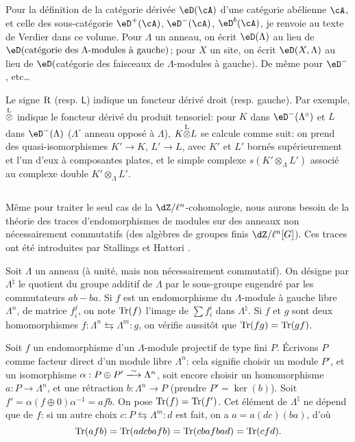 \subsection{}\label{II:4-1}

Pour la définition de la catégorie dérivée $\eD(\cA)$ d'une catégorie 
abélienne $\cA$, et celle des sous-catégorie $\eD^+(\cA)$, $\eD^-(\cA)$, 
$\eD^b(\cA)$, je renvoie au texte de Verdier dans ce volume. Pour $\Lambda$ 
un anneau, on écrit $\eD(\Lambda)$ au lieu de 
$\eD(\text{catégorie des $\Lambda$-modules à gauche})$; pour $X$ un site, on 
écrit $\eD(X,\Lambda)$ au lieu de 
$\eD($catégorie des faisceaux de $\Lambda$-modules à gauche$)$. De 
même pour $\eD^-$, etc\ldots

Le signe $\mathrm{R}$ (resp. $\mathsf{L}$) indique un foncteur dérivé droit (resp. 
gauche). Par exemple, ${\overset{\mathrm{L}}{\otimes}}$ indique le foncteur dérivé du produit 
tensoriel: pour $K$ dans $\eD^-(\Lambda^\circ)$ et $L$ dans $\eD^-(\Lambda)$ 
($\Lambda^\circ$ anneau opposé à $\Lambda$), $K{\overset{\mathrm{L}}{\otimes}} L$ se calcule 
comme suit: on prend des quasi-isomorphismes $K'\to K$, $L'\to L$, avec 
$K'$ et $L'$ bornés supérieurement et l'un d'eux à composantes plates, et 
le simple complexe $s(K'\otimes_\Lambda L')$ associé au complexe double 
$K'\otimes_\Lambda L'$. 





\subsection{}\label{II:4-2}

Même pour traiter le seul cas de la $\dZ/\ell^n$-cohomologie, nous aurons 
besoin de la théorie des traces d'endomorphismes de modules sur des anneaux 
non nécessairement commutatifs (des algèbres de groupes finis 
$\dZ/\ell^n[G]$). Ces traces ont été introduites par Stallings et Hattori 
\cite{ba76}. 

Soit $\Lambda$ un anneau (à unité, mais non nécessairement commutatif). 
On désigne par $\Lambda^\natural$ le quotient du groupe additif de $\Lambda$ par le 
sous-groupe engendré par les commutateurs $a b - b a$. Si $f$ est un 
endomorphisme du $\Lambda$-module à gauche libre $\Lambda^n$, de matrice 
$f_i^j$, on note $\operatorname{Tr}(f)$ l'image de $\sum f_i^i$ dans $\Lambda^\natural$. 
Si $f$ et $g$ sont deux homomorphismes 
$f:\Lambda^n \leftrightarrows \Lambda^m : g$, on vérifie aussitôt que 
$\operatorname{Tr}(f g) = \operatorname{Tr}(g f)$. 

Soit $f$ un endomorphisme d'un $\Lambda$-module projectif de type fini $P$. 
Écrivons $P$ comme facteur direct d'un module libre $\Lambda^n$: cela signifie 
choisir un module $P'$, et un isomorphisme $\alpha:P\oplus P'\iso \Lambda^n$, 
soit encore choisir un homomorphisme $a:P\to \Lambda^n$, et une rétraction 
$b:\Lambda^n\to P$ (prendre $P'=\ker(b)$). Soit 
$f'=\alpha(f\oplus 0)\alpha^{-1} =af b$. On pose $\operatorname{Tr}(f) = \operatorname{Tr}(f')$. Cet 
élément de $\Lambda^\natural$ ne dépend que de $f$: si un autre choix 
$c:P\leftrightarrows \Lambda^m:d$ est fait, on a $a=a(dc)(ba)$, d'où 
\[
 \operatorname{Tr}(a f b) = \operatorname{Tr}(adcbafb) = \operatorname{Tr}(cbafbad) = \operatorname{Tr}(cfd) \text{.}
\]

